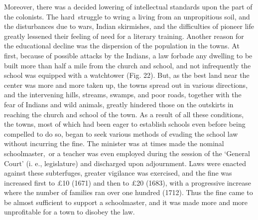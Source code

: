 \documentclass[
]{book}
\begin{document}
Moreover, there was a decided lowering of intellectual standards upon the part of the colonists. The hard~struggle to wring a living from an unpropitious soil, and the disturbances due to wars, Indian skirmishes, and the difficulties of pioneer life greatly lessened their feeling of need for a literary training. Another reason for the educational decline was the dispersion of the population in the towns. At first, because of possible attacks by the Indians, a law forbade any dwelling to be built more than half a mile from the church and school, and not infrequently the school was equipped with a watchtower (Fig. 22). But, as the best land near the center was more and more taken up, the towns spread out in various directions, and the intervening hills, streams, swamps, and poor roads, together with the fear of Indians and wild animals, greatly hindered those on the outskirts in reaching the church and school of the town. As a result of all these conditions, the towns, most of which had been eager to establish schools even before being compelled to do so, began to seek various methods of evading the school law without incurring the fine. The minister was at times made the nominal schoolmaster,~or a teacher was even employed during the session of the `General Court' (i. e., legislature) and discharged upon adjournment. Laws were enacted against these subterfuges, greater vigilance was exercised, and the fine was increased first to £10 (1671) and then to £20 (1683), with a progressive increase where the number of families ran over one hundred (1712). Thus the fine came to be almost sufficient to support a schoolmaster, and it was made more and more unprofitable for a town to disobey the law.
\end{document}
